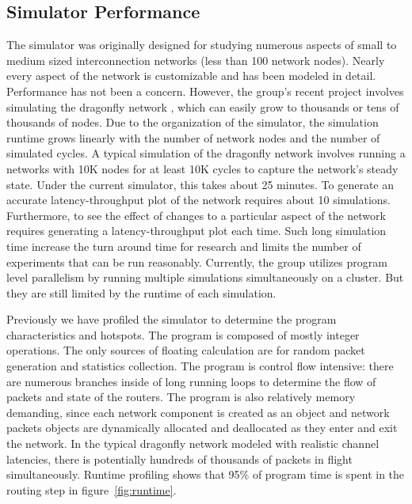 \subsection{Simulator Performance}
The simulator was originally designed for studying numerous aspects of small to medium sized interconnection networks (less than 100 network nodes). Nearly every aspect of the network is customizable and has been modeled in detail. Performance has not been a concern. However, the group's recent project involves simulating the dragonfly network \cite{cdragon}, which can easily grow to thousands or tens of thousands of nodes. Due to the organization of the simulator, the simulation runtime grows linearly with the number of network nodes and the number of simulated cycles. A typical simulation of the dragonfly network involves running a networks with 10K nodes for at least 10K cycles to capture the network's steady state. Under the current simulator, this takes about 25 minutes. To generate an accurate latency-throughput plot of the network requires about 10 simulations. Furthermore, to see the effect of changes to a particular aspect of the network requires generating a latency-throughput plot each time. Such long simulation time increase the turn around time for research and limits the number of experiments that can be run reasonably. Currently, the group utilizes program level parallelism by running multiple simulations simultaneously on a cluster. But they are still limited by the runtime of each simulation.

Previously we have profiled the simulator to determine the program characteristics and hotspots. The program is composed of mostly integer operations. The only sources of floating calculation are for random packet generation and statistics collection. The program is control flow intensive: there are numerous branches inside of long running loops to determine the flow of packets and state of the routers. The program is also relatively memory demanding, since each network component is created as an object and network packets objects are dynamically allocated and deallocated as they enter and exit the network. In the typical dragonfly network modeled with realistic channel latencies, there is potentially hundreds of thousands of packets in flight simultaneously. Runtime profiling shows that 95\% of program time is spent in the routing step in figure~\ref{fig:runtime}. 

